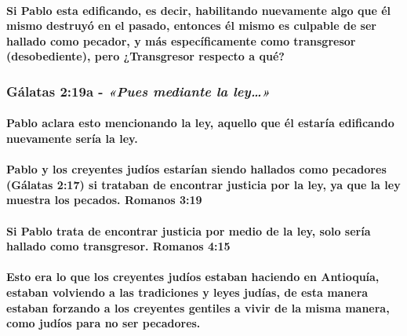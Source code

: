\documentclass[11a pt,twoside]{article}
\newcommand{\scripture}[1]{%
  {\fontsize{12pt}{16pt}\selectfont\ScriptureFont\itshape #1}%
}
\let\oldsubsubsection\subsubsection
\renewcommand{\subsubsection}{\needspace{4\baselineskip}\oldsubsubsection}
\let\oldparagraph\paragraph
\renewcommand{\paragraph}{\needspace{3\baselineskip}\oldparagraph}
\begin{document}
\paragraph{Si Pablo esta edificando, es decir, habilitando nuevamente
algo que él mismo destruyó en el pasado, entonces él mismo es culpable
de ser hallado como pecador, y más específicamente como transgresor
(desobediente), pero ¿Transgresor respecto a
qué?}\label{si-pablo-esta-edificando-es-decir-habilitando-nuevamente-algo-que-uxe9l-mismo-destruyuxf3-en-el-pasado-entonces-uxe9l-mismo-es-culpable-de-ser-hallado-como-pecador-y-muxe1s-especuxedficamente-como-transgresor-desobediente-pero-transgresor-respecto-a-quuxe9}

\subsubsection{\texorpdfstring{Gálatas 2:19a -
\scripture{«Pues mediante la ley…»}}{Gálatas 2:19a - }}\label{guxe1latas-219a---pues-mediante-la-ley}

\paragraph{Pablo aclara esto mencionando la ley, aquello que él estaría
edificando nuevamente sería la
ley.}\label{pablo-aclara-esto-mencionando-la-ley-aquello-que-uxe9l-estaruxeda-edificando-nuevamente-seruxeda-la-ley.}

\paragraph{Pablo y los creyentes judíos estarían siendo hallados como
pecadores (Gálatas 2:17) si trataban de encontrar justicia por la ley,
ya que la ley muestra los pecados. Romanos
3:19}\label{pablo-y-los-creyentes-juduxedos-estaruxedan-siendo-hallados-como-pecadores-guxe1latas-217-si-trataban-de-encontrar-justicia-por-la-ley-ya-que-la-ley-muestra-los-pecados.-romanos-319}

\paragraph{Si Pablo trata de encontrar justicia por medio de la ley,
solo sería hallado como transgresor. Romanos
4:15}\label{si-pablo-trata-de-encontrar-justicia-por-medio-de-la-ley-solo-seruxeda-hallado-como-transgresor.-romanos-415}

\paragraph{Esto era lo que los creyentes judíos estaban haciendo en
Antioquía, estaban volviendo a las tradiciones y leyes judías, de esta
manera estaban forzando a los creyentes gentiles a vivir de la misma
manera, como judíos para no ser
pecadores.}\label{esto-era-lo-que-los-creyentes-juduxedos-estaban-haciendo-en-antioquuxeda-estaban-volviendo-a-las-tradiciones-y-leyes-juduxedas-de-esta-manera-estaban-forzando-a-los-creyentes-gentiles-a-vivir-de-la-misma-manera-como-juduxedos-para-no-ser-pecadores.}
\end{document}
